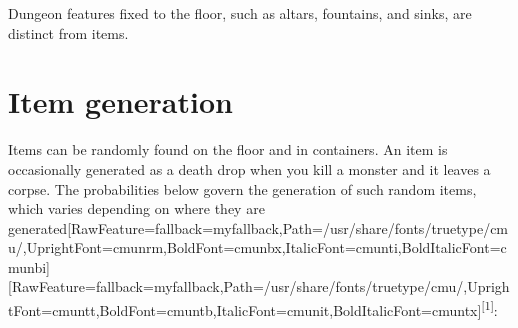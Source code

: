Dungeon features\footnotemark[25] fixed to the floor, such as altars\footnotemark[26], fountains\footnotemark[27], and sinks\footnotemark[28], are distinct from items.

\section{Item generation}
\label{2}
Items can be randomly found on the floor and in containers. An item is occasionally generated as a death drop\footnotemark[29] when you\footnotemark[30] kill a monster and it leaves a corpse. The probabilities below govern the generation of such random items, which varies depending on where they are generated\allowbreak{}\setmainfont{cmunrm.ttf}[RawFeature={fallback=myfallback},Path=/usr/share/fonts/truetype/cmu/,UprightFont=cmunrm,BoldFont=cmunbx,ItalicFont=cmunti,BoldItalicFont=cmunbi]\setmonofont{cmunrm.ttf}[RawFeature={fallback=myfallback},Path=/usr/share/fonts/truetype/cmu/,UprightFont=cmuntt,BoldFont=cmuntb,ItalicFont=cmunit,BoldItalicFont=cmuntx]\textsuperscript{{$\text{[}$}1{$\text{]}$}}:

